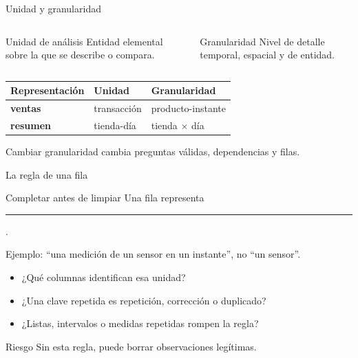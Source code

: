 \documentclass[aspectratio=169,11pt]{beamer}
\newcommand{\codigo}[1]{\texttt{\detokenize{#1}}}
\begin{document}
\begin{frame}{Unidad y granularidad}
  \begin{columns}[T]
      \begin{block}{Unidad de análisis}
        Entidad elemental sobre la que se describe o compara.
      \end{block}
      \begin{block}{Granularidad}
        Nivel de detalle temporal, espacial y de entidad.
      \end{block}
  \end{columns}
  \vspace{.5em}
  \small
  \begin{tabularx}{\textwidth}{>{\bfseries}p{} X X}
    \toprule
    Representación & Unidad & Granularidad \\
    \midrule
    ventas & transacción & producto-instante \\
    resumen & tienda-día & tienda $\times$ día \\
    \bottomrule
  \end{tabularx}
  \vfill
  \centering\alert{Cambiar granularidad cambia preguntas válidas, dependencias y filas.}
\end{frame}

\begin{frame}{La regla de una fila}
  \begin{block}{Completar antes de limpiar}
    \centering\large Una fila representa \rule{5cm}{.4pt}.
  \end{block}
  Ejemplo: ``una medición de un sensor en un instante'', no ``un sensor''.
  \begin{itemize}
    \item ¿Qué columnas identifican esa unidad?
    \item ¿Una clave repetida es repetición, corrección o duplicado?
    \item ¿Listas, intervalos o medidas repetidas rompen la regla?
  \end{itemize}
  \begin{alertblock}{Riesgo}
    Sin esta regla, \codigo{drop_duplicates()} puede borrar observaciones legítimas.
  \end{alertblock}
\end{frame}
\end{document}
